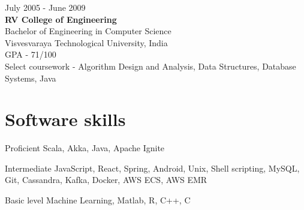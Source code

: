\documentclass{tccv}
\begin{document}
{\hfill\sc July 2005 - June 2009}\\
\textbf{RV College of Engineering}\\
Bachelor of Engineering in Computer Science\\
Visvesvaraya Technological University, India\\
GPA - 71/100\\
Select coursework - Algorithm Design and Analysis, Data Structures, Database Systems, Java\\ 


\vspace{-0.2in}
\section{Software skills}
\begin{factlist}
\item{Proficient}
     {Scala, Akka, Java, Apache Ignite}

\item{Intermediate}
     {JavaScript, React, Spring, Android, Unix, Shell scripting, MySQL, Git, Cassandra, Kafka, Docker, AWS ECS, AWS EMR}

\item{Basic level}
     {Machine Learning, Matlab, R, C++, C}
\end{factlist}
\end{document}
